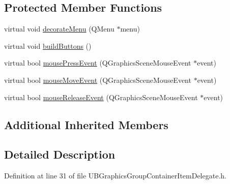 \subsection*{Protected Member Functions}
\begin{DoxyCompactItemize}
\item 
virtual void \hyperlink{class_u_b_graphics_group_container_item_delegate_ad9b48a54f407c9ba9934042d3a4b9958}{decorate\-Menu} (Q\-Menu $\ast$menu)
\item 
virtual void \hyperlink{class_u_b_graphics_group_container_item_delegate_add356059ee48a2efe7cd66223bebe3cd}{build\-Buttons} ()
\item 
virtual bool \hyperlink{class_u_b_graphics_group_container_item_delegate_a0eef4acf8124b18a6f495402188dbefc}{mouse\-Press\-Event} (Q\-Graphics\-Scene\-Mouse\-Event $\ast$event)
\item 
virtual bool \hyperlink{class_u_b_graphics_group_container_item_delegate_aece12f59a1266894ed380bf6e4d14cbf}{mouse\-Move\-Event} (Q\-Graphics\-Scene\-Mouse\-Event $\ast$event)
\item 
virtual bool \hyperlink{class_u_b_graphics_group_container_item_delegate_ada28e38639a3ccfadf70bd0628b8d942}{mouse\-Release\-Event} (Q\-Graphics\-Scene\-Mouse\-Event $\ast$event)
\end{DoxyCompactItemize}
\subsection*{Additional Inherited Members}


\subsection{Detailed Description}


Definition at line 31 of file U\-B\-Graphics\-Group\-Container\-Item\-Delegate.\-h.



